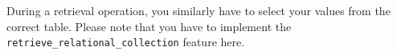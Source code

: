 During a retrieval operation, you similarly have to select your values from the correct table.
Please note that you have to implement the \lstinline!retrieve_relational_collection! feature here.







